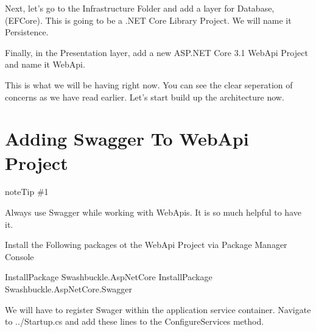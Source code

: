 \documentclass[letterpaper,10pt,english]{sphinxmanual}
\begin{document}
Next, let’s go to the Infrastructure Folder and add a layer for Database, (EFCore). This is going to be a .NET Core Library Project. We will name it Persistence.

\noindent{}

Finally, in the Presentation layer, add a new ASP.NET Core 3.1 WebApi Project and name it WebApi.

\noindent{}

This is what we will be having right now. You can see the clear seperation of concerns as we have read earlier. Let’s start build up the architecture now.

\noindent{}


\section{Adding Swagger To WebApi Project}
\label{\detokenize{OnionArchitecture/details:adding-swagger-to-webapi-project}}
\begin{sphinxadmonition}{note}{Tip \#1}

Always use Swagger while working with WebApis. It is so much helpful to have it.
\end{sphinxadmonition}

Install the Following packages ot the WebApi Project via Package Manager Console

\begin{sphinxVerbatim}[commandchars=\\\{\}]
Install\PYGZhy{}Package Swashbuckle.AspNetCore
Install\PYGZhy{}Package Swashbuckle.AspNetCore.Swagger
\end{sphinxVerbatim}

We will have to register Swager within the application service container. Navigate to ../Startup.cs and add these lines to the ConfigureServices method.

\begin{sphinxVerbatim}[commandchars=\\\{\}]
 
     
      
          
          
\end{sphinxVerbatim}
\end{document}
